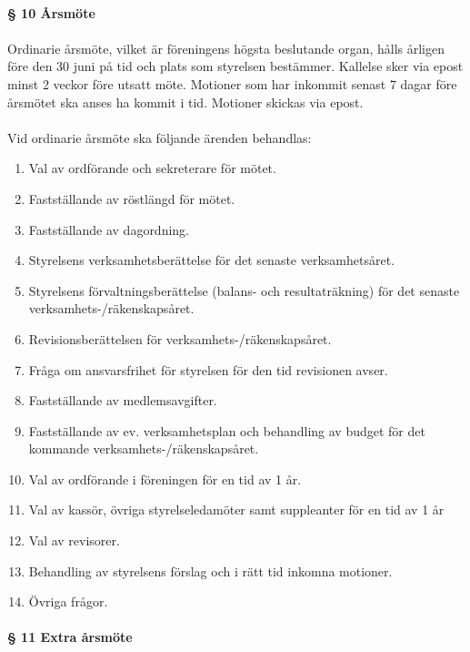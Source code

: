 \documentclass[12pt, a4paper]{article}
\begin{document}
\paragraph{§ 10 Årsmöte}
\paragraph{}
Ordinarie årsmöte, vilket är föreningens högsta beslutande organ, hålls årligen före den 30 juni på tid och plats som styrelsen bestämmer. Kallelse sker via epost minst 2 veckor före utsatt möte. Motioner som har inkommit senast 7 dagar före årsmötet ska anses ha kommit i tid. Motioner skickas via epost.

\paragraph{}
Vid ordinarie årsmöte ska följande ärenden behandlas:
\begin{enumerate}
\item Val av ordförande och sekreterare för mötet.
\item Fastställande av röstlängd för mötet.
\item Fastställande av dagordning.
\item Styrelsens verksamhetsberättelse för det senaste verksamhetsåret.
\item Styrelsens förvaltningsberättelse (balans- och resultaträkning) för det senaste verksamhets-/räkenskapsåret.
\item Revisionsberättelsen för verksamhets-/räkenskapsåret.
\item Fråga om ansvarsfrihet för styrelsen för den tid revisionen avser.
\item Fastställande av medlemsavgifter.
\item Fastställande av ev. verksamhetsplan och behandling av budget för det kommande verksamhets-/räkenskapsåret.
\item Val av ordförande i föreningen för en tid av 1 år.
\item Val av kassör, övriga styrelseledamöter samt suppleanter för en tid av 1 år
\item Val av revisorer.
\item Behandling av styrelsens förslag och i rätt tid inkomna motioner.
\item Övriga frågor. 
\end{enumerate}

\paragraph{§ 11 Extra årsmöte}
\end{document}
